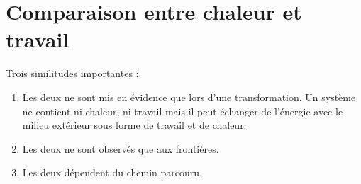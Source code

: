 \section{Comparaison entre chaleur et travail}
Trois similitudes importantes :
\begin{enumerate}
	\item Les deux ne sont mis en évidence que lors d'une transformation. 
	      Un système ne contient ni chaleur, ni travail mais il peut échanger 
	      de l'énergie avec le milieu extérieur sous forme de travail et de chaleur.
	\item Les deux ne sont observés que aux frontières.
	\item Les deux dépendent du chemin parcouru.
\end{enumerate}


